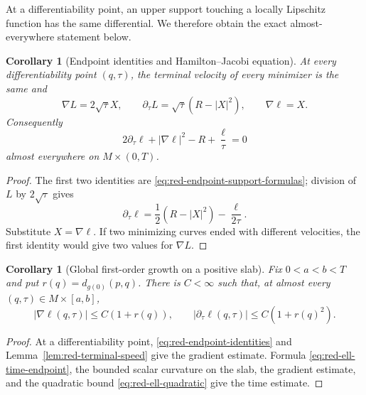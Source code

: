 \documentclass[10pt]{coll-l}
\newtheorem{corollary}[theorem]{Corollary}
\theoremstyle{definition}
\theoremstyle{remark}
\numberwithin{section}{chapter}
\numberwithin{equation}{chapter}
\begin{document}
At a differentiability point, an upper support touching a locally Lipschitz
function has the same differential.  We therefore obtain the exact
almost-everywhere statement below.

\begin{corollary}[Endpoint identities and Hamilton--Jacobi equation]
\label{cor:red-Hamilton-Jacobi}
At every differentiability point $(q,\tau)$, the terminal velocity of every
minimizer is the same and
\begin{equation}
 \nabla L=2\sqrt\tau X,
 \qquad
 \partial_\tau L=\sqrt\tau(R-|X|^2),
 \qquad
 \nabla\ell=X.                                         \label{eq:red-endpoint-identities}
\end{equation}
Consequently
\begin{equation}
 2\partial_\tau\ell+|\nabla\ell|^2-R+\frac\ell\tau=0
                                                               \label{eq:red-Hamilton-Jacobi}
\end{equation}
almost everywhere on $M\times(0,T)$.
\end{corollary}

\begin{proof}
The first two identities are
\eqref{eq:red-endpoint-support-formulas}; division of $L$ by
$2\sqrt\tau$ gives
\begin{equation}
 \partial_\tau\ell
 =\frac12(R-|X|^2)-\frac\ell{2\tau}.                   \label{eq:red-ell-time-endpoint}
\end{equation}
Substitute $X=\nabla\ell$.  If two minimizing curves ended with different
velocities, the first identity would give two values for $\nabla L$.
\end{proof}

\begin{corollary}[Global first-order growth on a positive slab]
\label{cor:red-first-order-growth}
Fix $0<a<b<T$ and put $r(q)=d_{g(0)}(p,q)$.  There is $C<\infty$ such that,
at almost every $(q,\tau)\in M\times[a,b]$,
\begin{equation}
 |\nabla\ell(q,\tau)|\leq C(1+r(q)),
 \qquad
 |\partial_\tau\ell(q,\tau)|\leq C(1+r(q)^2).         \label{eq:red-ell-first-growth}
\end{equation}
\end{corollary}

\begin{proof}
At a differentiability point, \eqref{eq:red-endpoint-identities} and
Lemma~\ref{lem:red-terminal-speed} give the gradient estimate.  Formula
\eqref{eq:red-ell-time-endpoint}, the bounded scalar curvature on the slab,
the gradient estimate, and the quadratic bound
\eqref{eq:red-ell-quadratic} give the time estimate.
\end{proof}
\end{document}

